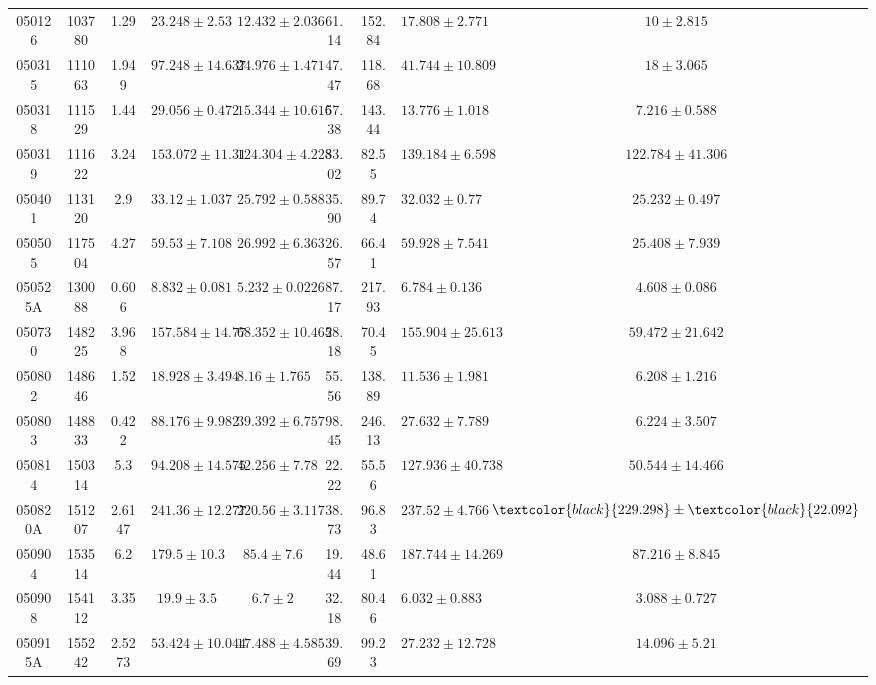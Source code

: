 \documentclass[prd,nofootinbib,preprintnumbers,floatfix]{revtex4}  %
\newcommand{\rthis}[1]{\textcolor{black}{#1}}
\begin{document}
\begin{center}
\begin{longtable*}{|c|c|c|c|c|c|c|c|c|}
050126	&	103780	&	1.29	&	$	23.248	\pm	2.53	$	&	$	12.432	\pm	2.036	$	&	61.14	&	152.84	&	$	17.808	\pm	2.771	$	&	$	10	\pm	2.815	$	\\
050315	&	111063	&	1.949	&	$	97.248	\pm	14.637	$	&	$	24.976	\pm	1.471	$	&	47.47	&	118.68	&	$	41.744	\pm	10.809	$	&	$	18	\pm	3.065	$	\\
050318	&	111529	&	1.44	&	$	29.056	\pm	0.472	$	&	$	15.344	\pm	10.616	$	&	57.38	&	143.44	&	$	13.776	\pm	1.018	$	&	$	7.216	\pm	0.588	$	\\
050319	&	111622	&	3.24	&	$	153.072	\pm	11.31	$	&	$	124.304	\pm	4.228	$	&	33.02	&	82.55	&	$	139.184	\pm	6.598	$	&	$	122.784	\pm	41.306	$	\\
050401	&	113120	&	2.9	&	$	33.12	\pm	1.037	$	&	$	25.792	\pm	0.588	$	&	35.90	&	89.74	&	$	32.032	\pm	0.77	$	&	$	25.232	\pm	0.497	$	\\
050505	&	117504	&	4.27	&	$	59.53	\pm	7.108	$	&	$	26.992	\pm	6.363	$	&	26.57	&	66.41	&	$	59.928	\pm	7.541	$	&	$	25.408	\pm	7.939	$	\\
050525A	&	130088	&	0.606	&	$	8.832	\pm	0.081	$	&	$	5.232	\pm	0.0226	$	&	87.17	&	217.93	&	$	6.784	\pm	0.136	$	&	$	4.608	\pm	0.086	$	\\
050730	&	148225	&	3.968	&	$	157.584	\pm	14.77	$	&	$	68.352	\pm	10.465	$	&	28.18	&	70.45	&	$	155.904	\pm	25.613	$	&	$	59.472	\pm	21.642	$	\\
050802	&	148646	&	1.52	&	$	18.928	\pm	3.494	$	&	$	8.16	\pm	1.765	$	&	55.56	&	138.89	&	$	11.536	\pm	1.981	$	&	$	6.208	\pm	1.216	$	\\
050803	&	148833	&	0.422	&	$	88.176	\pm	9.982	$	&	$	39.392	\pm	6.757	$	&	98.45	&	246.13	&	$	27.632	\pm	7.789	$	&	$	6.224	\pm	3.507	$	\\
050814	&	150314	&	5.3	&	$	94.208	\pm	14.575	$	&	$	42.256	\pm	7.78	$	&	22.22	&	55.56	&	$	127.936	\pm	40.738	$	&	$	50.544	\pm	14.466	$	\\
050820A	&	151207	&	2.6147	&	$	241.36	\pm	12.277	$	&	$	220.56	\pm	3.117	$	&	38.73	&	96.83	&	$	237.52	\pm	4.766	$	&	$	\rthis{229.298}	\pm	\rthis{22.092}	$	\\
050904	&	153514	&	6.2	&	$	179.5	\pm	10.3	$	&	$	85.4	\pm	7.6	$	&	19.44	&	48.61	&	$	187.744	\pm	14.269	$	&	$	87.216	\pm	8.845	$	\\
050908	&	154112	&	3.35	&	$	19.9	\pm	3.5	$	&	$	6.7	\pm	2	$	&	32.18	&	80.46	&	$	6.032	\pm	0.883	$	&	$	3.088	\pm	0.727	$	\\
050915A	&	155242	&	2.5273	&	$	53.424	\pm	10.044	$	&	$	17.488	\pm	4.585	$	&	39.69	&	99.23	&	$	27.232	\pm	12.728	$	&	$	14.096	\pm	5.21	$	\\

\end{longtable*}
\end{center}
\end{document}
